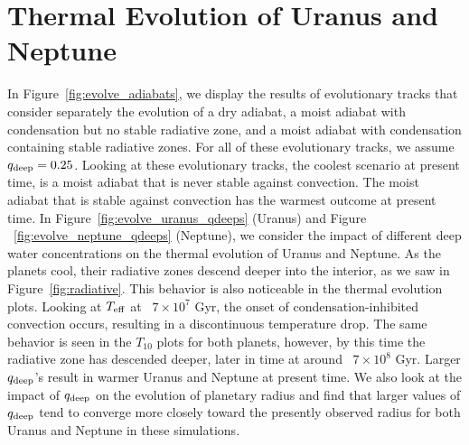 \documentclass[11pt]{ucscthesisbs}
\begin{document}
{{\section{Thermal Evolution of Uranus and Neptune}

In Figure~\ref{fig:evolve_adiabats}, we display the results of evolutionary tracks that consider separately the evolution of a dry adiabat, a moist adiabat with condensation but no stable radiative zone, and a moist adiabat with condensation containing stable radiative zones. For all of these evolutionary tracks, we assume $q_{\rm deep} = 0.25$. Looking at these evolutionary tracks, the coolest scenario at present time, is a moist adiabat that is never stable against convection. The moist adiabat that is stable against convection has the warmest outcome at present time. In Figure~\ref{fig:evolve_uranus_qdeeps} (Uranus) and Figure ~\ref{fig:evolve_neptune_qdeeps} (Neptune), we consider the impact of different deep water concentrations on the thermal evolution of Uranus and Neptune. As the planets cool, their radiative zones descend deeper into the interior, as we saw in Figure~\ref{fig:radiative}. This behavior is also noticeable in the thermal evolution plots. Looking at $T_{\rm eff}$ at ~$7 \times 10^7$ Gyr, the onset of condensation-inhibited convection occurs, resulting in a discontinuous temperature drop. The same behavior is seen in the $T_{10}$ plots for both planets, however, by this time the radiative zone has descended deeper, later in time at around ~$7 \times 10^8$ Gyr. Larger $q_{\rm deep}$'s result in warmer Uranus and Neptune at present time. We also look at the impact of $q_{\rm deep}$ on the evolution of planetary radius and find that larger values of $q_{\rm deep}$ tend to converge more closely toward the presently observed radius for both Uranus and Neptune in these simulations. 

}}
\end{document}
